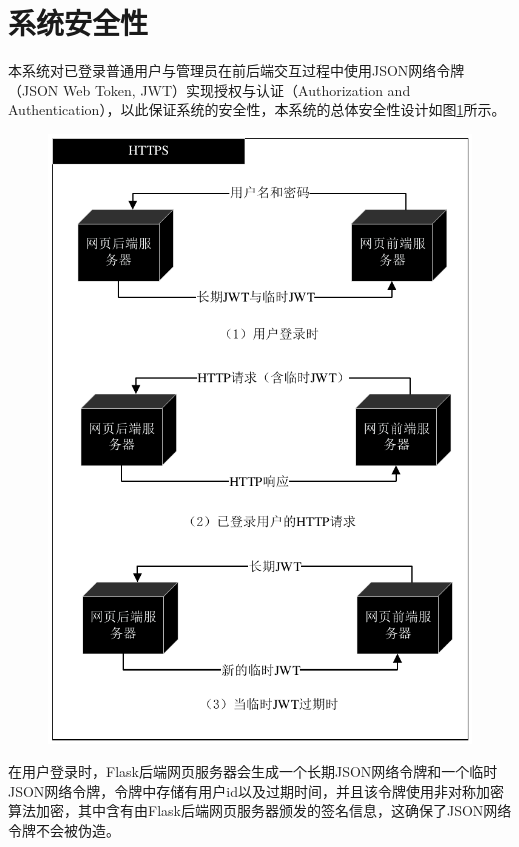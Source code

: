 \documentclass{bjfuthesis}
\begin{document}
\section{系统安全性}
本系统对已登录普通用户与管理员在前后端交互过程中使用JSON网络令牌（JSON Web Token, JWT）实现授权与认证（Authorization and Authentication），以此保证系统的安全性，本系统的总体安全性设计如图\ref{fig:jwt}所示。

\begin{figure}
	\includegraphics{figures/jwt.pdf}
	\label{fig:jwt}
\end{figure}

在用户登录时，Flask后端网页服务器会生成一个长期JSON网络令牌和一个临时JSON网络令牌，令牌中存储有用户id以及过期时间，并且该令牌使用非对称加密算法加密，其中含有由Flask后端网页服务器颁发的签名信息，这确保了JSON网络令牌不会被伪造。
\end{document}
